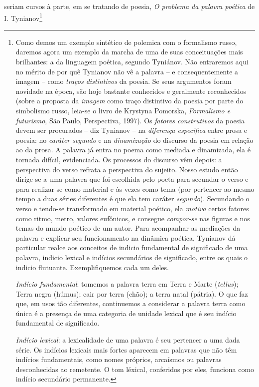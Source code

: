 seriam cursos à parte, em se tratando de poesia, \emph{O problema da
palavra poética} de I. Tynianov\footnote{Como demos um exemplo sintético
  de polemica com o formalismo russo, daremos agora um exemplo da marcha
  de uma de suas conceituações mais brilhantes: a da linguagem poética,
  segundo Tyniánov. Não entraremos aqui no mérito de por quê Tynianov
  não vê a palavra -- e consequentemente a imagem -- como \emph{traços
  distintivos} da poesia. Se seus argumentos foram novidade na época,
  são hoje bastante conhecidos e geralmente reconhecidos (sobre a
  proposta da \emph{imagem} como traço distintivo da poesia por parte do
  simbolismo russo, leia-se o livro de Krystyna Pomorska,
  \emph{Formalismo e futurismo}, São Paulo, Perspectiva, 1997). Os
  \emph{fatores construtivos} da poesia devem ser procurados -- diz
  Tynianov -- na \emph{diferença especifica} entre prosa e poesia: no
  \emph{caráter segundo} e na \emph{dinamização} do discurso da poesia
  em relação ao da prosa. A palavra já entra no poema como mediada e
  dinamizada, ela é tornada difícil, evidenciada. Os processos do
  discurso vêm depois: a perspectiva do verso refrata a perspectiva do
  sujeito. Nosso estudo então dirige-se a uma palavra que foi escolhida
  pelo poeta para secundar o verso e para realizar-se como material e às
  vezes como tema (por pertencer ao mesmo tempo a duas séries diferentes
  é que ela tem caráter \emph{segundo}). Secundando o verso e tendo-se
  transformado em material poético, ela \emph{motiva} certos fatores
  como ritmo, metro, valores eufônicos, e consegue \emph{compor-se} nas
  figuras e nos temas do mundo poético de um autor. Para acompanhar as
  mediações da palavra e explicar seu funcionamento na dinâmica poética,
  Tynianov dá particular realce aos conceitos de indicio fundamental de
  significado de uma palavra, indicio lexical e indícios secundários de
  significado, entre os quais o indicio flutuante. Exemplifiquemos cada
  um deles.

  \emph{Indício fundamental}: tomemos a palavra terra em Terra e Marte
  (\emph{tellus}); Terra negra (húmus); cair por terra (chão); a terra
  natal (pátria). O que faz que, em usos tão diferentes, continuemos a
  considerar a palavra terra como única é a presença de uma categoria de
  unidade lexical que é seu indício fundamental de significado.

  \emph{Indício lexical}: a lexicalidade de uma palavra é seu pertencer
  a uma dada série. Os indícios lexicais mais fortes aparecem em
  palavras que não têm indícios fundamentais, como nomes próprios,
  arcaísmos ou palavras desconhecidas ao remetente. O tom léxical,
  conferidos por eles, funciona como indício secundário permanente.

}
